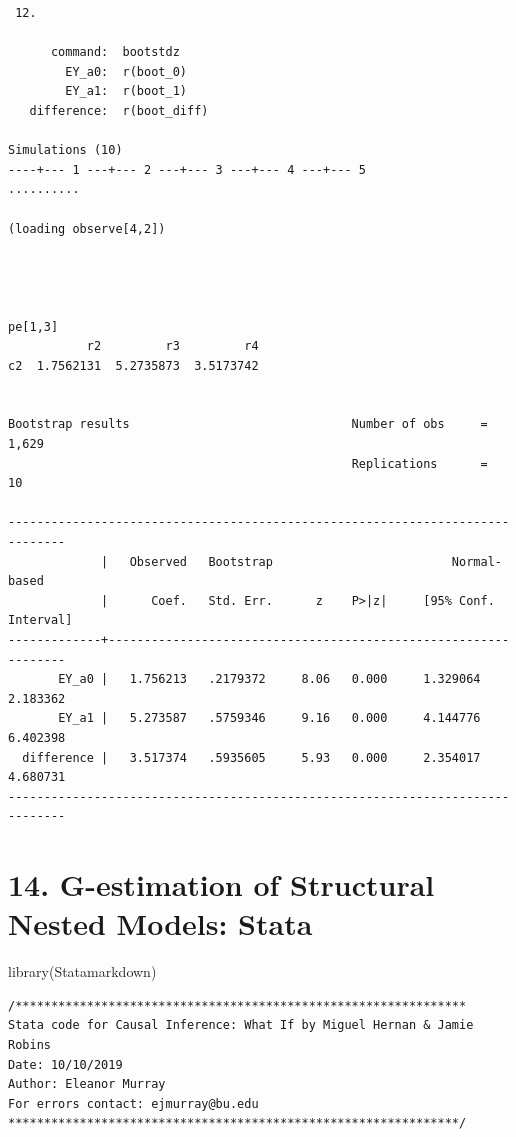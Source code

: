 \documentclass[
  10pt,
]{book}
\newenvironment{Shaded}{\begin{snugshade}}{\end{snugshade}}
\newcommand{\FunctionTok}[1]{\textcolor[rgb]{0.00,0.00,0.00}{#1}}
\newcommand{\NormalTok}[1]{#1}
\begin{document}
\begin{verbatim}
 12. 

      command:  bootstdz
        EY_a0:  r(boot_0)
        EY_a1:  r(boot_1)
   difference:  r(boot_diff)

Simulations (10)
----+--- 1 ---+--- 2 ---+--- 3 ---+--- 4 ---+--- 5 
..........

(loading observe[4,2])




pe[1,3]
           r2         r3         r4
c2  1.7562131  5.2735873  3.5173742


Bootstrap results                               Number of obs     =      1,629
                                                Replications      =         10

------------------------------------------------------------------------------
             |   Observed   Bootstrap                         Normal-based
             |      Coef.   Std. Err.      z    P>|z|     [95% Conf. Interval]
-------------+----------------------------------------------------------------
       EY_a0 |   1.756213   .2179372     8.06   0.000     1.329064    2.183362
       EY_a1 |   5.273587   .5759346     9.16   0.000     4.144776    6.402398
  difference |   3.517374   .5935605     5.93   0.000     2.354017    4.680731
------------------------------------------------------------------------------
\end{verbatim}

\hypertarget{g-estimation-of-structural-nested-models-stata}{%
\chapter*{14. G-estimation of Structural Nested Models: Stata}\label{g-estimation-of-structural-nested-models-stata}}

\begin{Shaded}
\begin{Highlighting}[]
\FunctionTok{library}\NormalTok{(Statamarkdown)}
\end{Highlighting}
\end{Shaded}

\begin{verbatim}
/***************************************************************
Stata code for Causal Inference: What If by Miguel Hernan & Jamie Robins
Date: 10/10/2019
Author: Eleanor Murray 
For errors contact: ejmurray@bu.edu
***************************************************************/
\end{verbatim}
\end{document}
